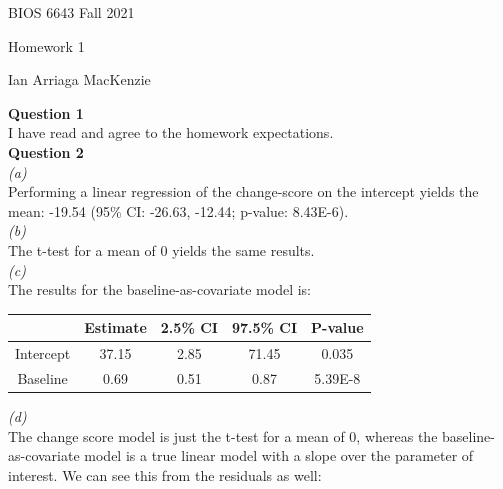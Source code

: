 \documentclass[11pt,a4paper]{article}
\begin{document}
\begin{flushright}
BIOS 6643 Fall 2021

Homework 1

Ian Arriaga MacKenzie
\end{flushright}

\textbf{Question 1}\\

I have read and agree to the homework expectations.\\

\textbf{Question 2}\\

\textit{(a)}\\

Performing a linear regression of the change-score on the intercept yields the mean: -19.54 (95\% CI: -26.63, -12.44; p-value: 8.43E-6).\\

\textit{(b)}\\

The t-test for a mean of 0 yields the same results.\\

\textit{(c)}\\

The results for the baseline-as-covariate model is:

\begin{table}[ht]
\centering
\begin{tabular}{c|c|c|c|c|}
\cline{2-5}
                                & Estimate & 2.5\% CI & 97.5\% CI & P-value \\ \hline
\multicolumn{1}{|c|}{Intercept} & 37.15    & 2.85     & 71.45     & 0.035   \\ \hline
\multicolumn{1}{|c|}{Baseline}  & 0.69     & 0.51     & 0.87      & 5.39E-8 \\ \hline
\end{tabular}
\end{table}

\textit{(d)}\\

The change score model is just the t-test for a mean of 0, whereas the baseline-as-covariate model is a true linear model with a slope over the parameter of interest. We can see this from the residuals as well:
\end{document}
